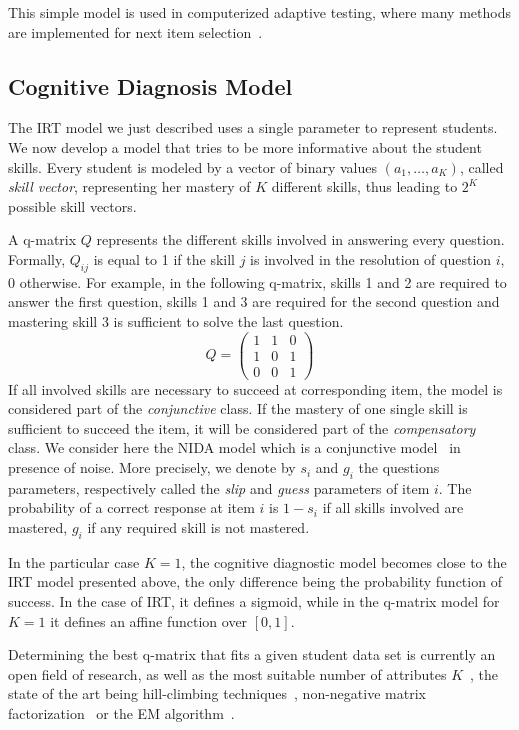 \documentclass{sig-alternate}
\begin{document}
This simple model is used in computerized adaptive testing, where many methods are implemented for next item selection~\citep{MagisRaiche2012}.

\subsection{Cognitive Diagnosis Model}

The IRT model we just described uses a single parameter to represent students. We now develop a model that tries to be more informative about the student skills. Every student is modeled by a vector of binary values $(a_1, \ldots, a_K)$, called \emph{skill vector}, representing her mastery of $K$ different skills, thus leading to $2^K$ possible skill vectors. 

A q-matrix $Q$ \citep{Tatsuoka1983} represents the different skills involved in answering every question. Formally, $Q_{ij}$ is equal to 1 if the skill $j$ is involved in the resolution of question $i$, 0 otherwise. For example, in the following q-matrix, skills 1 and 2 are required to answer the first question, skills 1 and 3 are required for the second question and mastering skill 3 is sufficient to solve the last question.
\[ Q = \left(\begin{array}{lll}
1 & 1 & 0\\
1 & 0 & 1\\
0 & 0 & 1
\end{array}\right) \]
If all involved skills are necessary to succeed at corresponding item, the model is considered part of the \emph{conjunctive} class. 
If the mastery of one single skill is sufficient to succeed the item, it will be considered part of the \emph{compensatory} class. We consider here the NIDA model which is a conjunctive model~\citep{Desmarais2012} in presence of noise. More precisely, we denote by $s_i$ and $g_i$ the questions parameters, respectively called the \emph{slip} and \emph{guess} parameters of item $i$. The probability of a correct response at item $i$ is $1 - s_i$ if all skills involved are mastered, $g_i$ if any required skill is not mastered.

In the particular case $K=1$, the cognitive diagnostic model becomes close to the IRT model presented above, the only difference being the probability function of success. In the case of IRT, it defines a sigmoid, while in the q-matrix model for $K = 1$ it defines an affine function over $[0,1]$.

Determining the best q-matrix that fits a given student data set is currently an open field of research, as well as the most suitable number of attributes $K$~\citep{Huebner2010}, the state of the art being hill-climbing techniques~\citep{Barnes2005}, non-negative matrix factorization~\citep{Desmarais2011} or the EM algorithm~\citep{Huebner2010}. 
\end{document}
